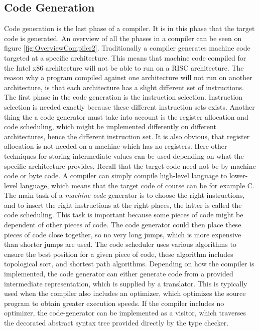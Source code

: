 \subsection{Code Generation}
Code generation is the last phase of a compiler. It is in this phase that the target code is generated. An overview of all the phases in a compiler can be seen on figure \ref{fig:OverviewCompiler2}. Traditionally a compiler generates machine code targeted at a specific architecture. This means that machine code compiled for the Intel x86 architecture will not be able to run on a RISC architecture. The reason why a program compiled against one architecture will not run on another architecture, is that each architecture has a slight different set of instructions. The first phase in the code generation is the instruction selection. Instruction selection is needed exactly because these different instruction sets exists. Another thing the a code generator must take into account is the register allocation and code scheduling, which might be implemented differently on different architectures, hence the different instruction set. It is also obvious, that register allocation is not needed on a machine which has no registers. Here other techniques for storing intermediate values can be used depending on what the specific architecture provides. Recall that the target code need not be by machine code or byte code. A compiler can simply compile high-level language to lower-level language, which means that the target code of course can be for example C. The main task of a \emph{machine code} generator is to choose the right instructions, and to insert the right instructions at the right places, the latter is called the code scheduling. This task is important because some pieces of code might be dependent of other pieces of code. The code generator could then place these pieces of code close together, so no very long jumps, which is more expensive than shorter jumps are used. The code scheduler uses various algorithms to ensure the best position for a given piece of code, these algorithm includes topological sort, and shortest path algorithms. Depending on how the compiler is implemented, the code generator can either generate code from a provided intermediate representation, which is supplied by a translator. This is typically used when the compiler also includes an optimizer, which optimizes the source program to obtain greater execution speeds. If the compiler includes no optimizer, the code-generator can be implemented as a visitor, which traverses the decorated abstract syntax tree provided directly by the type checker. 
